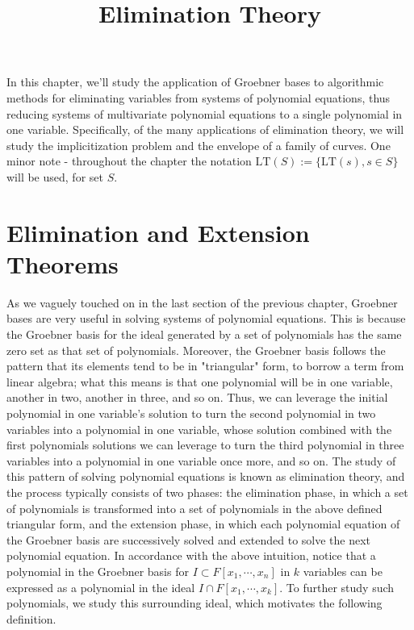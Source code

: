 \documentclass{article}
\begin{document}
\title{Elimination Theory}
\maketitle

In this chapter, we'll study the application of Groebner bases to algorithmic methods for eliminating variables from systems of polynomial equations, thus reducing systems of multivariate polynomial equations to a single polynomial in one variable. Specifically, of the many applications of elimination theory, we will study the implicitization problem and the envelope of a family of curves.
\newline
One minor note - throughout the chapter the notation $ \text{LT}(S) := \{ \text{LT}(s), s \in S \} $ will be used, for set $ S $.

\section{Elimination and Extension Theorems}
As we vaguely touched on in the last section of the previous chapter, Groebner bases are very useful in solving systems of polynomial equations. This is because the Groebner basis for the ideal generated by a set of polynomials has the same zero set as that set of polynomials. Moreover, the Groebner basis follows the pattern that its elements tend to be in "triangular" form, to borrow a term from linear algebra; what this means is that one polynomial will be in one variable, another in two, another in three, and so on. Thus, we can leverage the initial polynomial in one variable's solution to turn the second polynomial in two variables into a polynomial in one variable, whose solution combined with the first polynomials solutions we can leverage to turn the third polynomial in three variables into a polynomial in one variable once more, and so on.
\newline
The study of this pattern of solving polynomial equations is known as elimination theory, and the process typically consists of two phases: the elimination phase, in which a set of polynomials is transformed into a set of polynomials in the above defined triangular form, and the extension phase, in which each polynomial equation of the Groebner basis are successively solved and extended to solve the next polynomial equation.
\newline
In accordance with the above intuition, notice that a polynomial in the Groebner basis for $ I \subset F[x_1, \cdots, x_n] $ in $ k $ variables can be expressed as a polynomial in the ideal $ I \cap F[x_1, \cdots, x_k] $. To further study such polynomials, we study this surrounding ideal, which motivates the following definition.
\end{document}
